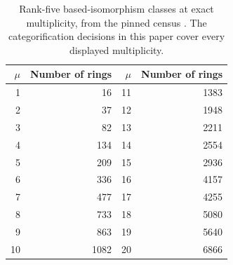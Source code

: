 \begin{table}[ht]\centering\small
\begin{tabular}{rrrr}\toprule
$\mu$&Number of rings&$\mu$&Number of rings\\\midrule
1&16&11&1383\\
2&37&12&1948\\
3&82&13&2211\\
4&134&14&2554\\
5&209&15&2936\\
6&336&16&4157\\
7&477&17&4255\\
8&733&18&5080\\
9&863&19&5640\\
10&1082&20&6866\\
\bottomrule\end{tabular}
\caption{Rank-five based-isomorphism classes at exact multiplicity, from the pinned census \cite{Census}. The categorification decisions in this paper cover every displayed multiplicity.}\label{tab:census}
\end{table}
